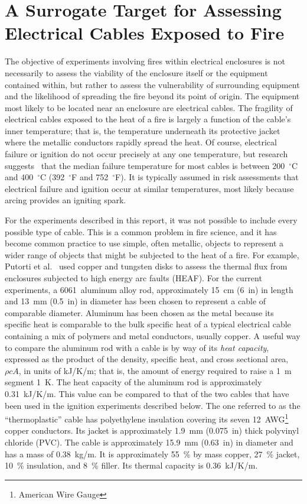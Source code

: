 \clearpage

\section{A Surrogate Target for Assessing Electrical Cables Exposed to Fire}
\label{cable_surrogate}

The objective of experiments involving fires within electrical enclosures is not necessarily to assess the viability of the enclosure itself or the equipment contained within, but rather to assess the vulnerability of surrounding equipment and the likelihood of spreading the fire beyond its point of origin. The equipment most likely to be located near an enclosure are electrical cables. The fragility of electrical cables exposed to the heat of a fire is largely a function of the cable's inner temperature; that is, the temperature underneath its protective jacket where the metallic conductors rapidly spread the heat. Of course, electrical failure or ignition do not occur precisely at any one temperature, but research suggests~\cite{CAROLFIRE} that the median failure temperature for most cables is between 200~$^\circ$C and 400~$^\circ$C (392~$^\circ$F and 752~$^\circ$F). It is typically assumed in risk assessments that electrical failure and ignition occur at similar temperatures, most likely because arcing provides an igniting spark.

For the experiments described in this report, it was not possible to include every possible type of cable. This is a common problem in fire science, and it has become common practice to use simple, often metallic, objects to represent a wider range of objects that might be subjected to the heat of a fire. For example, Putorti et al.~\cite{Putorti:SMIRT23} used copper and tungsten disks to assess the thermal flux from enclosures subjected to high energy arc faults (HEAF). For the current experiments, a 6061~aluminum alloy rod, approximately  15~cm (6~in) in length and 13~mm (0.5~in) in diameter has been chosen to represent a cable of comparable diameter. Aluminum has been chosen as the metal because its specific heat is comparable to the bulk specific heat of a typical electrical cable containing a mix of polymers and metal conductors, usually copper. A useful way to compare the aluminum rod with a cable is by way of its {\em heat capacity}, expressed as the product of the density, specific heat, and cross sectional area, $\rho c A$, in units of kJ/K/m; that is, the amount of energy required to raise a 1~m segment 1~K. The heat capacity of the aluminum rod is approximately 0.31~kJ/K/m. This value can be compared to that of the two cables that have been used in the ignition experiments described below. The one referred to as the ``thermoplastic'' cable has polyethylene insulation covering its seven 12~AWG\footnote{American Wire Gauge} copper conductors. Its jacket is approximately 1.9~mm (0.075~in) thick polyvinyl chloride (PVC). The cable is approximately 15.9~mm (0.63~in) in diameter and has a mass of 0.38~kg/m. It is approximately 55~\% by mass copper, 27~\% jacket, 10~\% insulation, and 8~\% filler. Its thermal capacity is 0.36~kJ/K/m.

